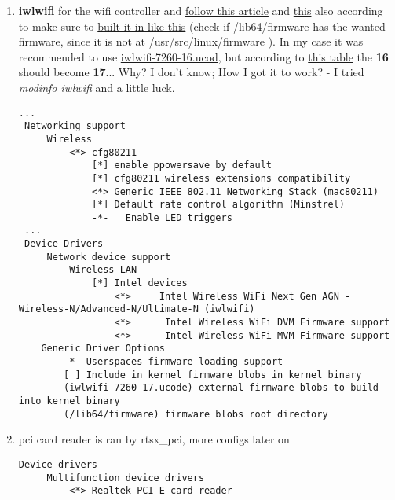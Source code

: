 \documentclass[10pt,a4paper]{article}
\begin{document}
\begin{enumerate}
                    \newpage
                    \item \textbf{iwlwifi} for the wifi controller and  \href{https://wiki.gentoo.org/wiki/Iwlwifi#Kernel}{follow this article} and \href{https://wiki.gentoo.org/wiki/Wifi#Kernel}{this} also according to make sure to \href{https://wiki.gentoo.org/wiki/Iwlwifi#When_using_built-in_configuration}{built it in like this} (check if /lib64/firmware has the wanted firmware, since it is not at /usr/src/linux/firmware ). In my case it was recommended to use \href{https://wiki.gentoo.org/wiki/Lenovo_ThinkPad_T440s#Required_packages}{iwlwifi-7260-16.ucod}, but according to \href{https://wireless.wiki.kernel.org/en/users/drivers/iwlwifi#firmware}{this table} the \textbf{16} should become \textbf{17}... Why? I don't know; How I got it to work? - I tried 
                    \textit{modinfo iwlwifi} and a little luck.
                    \begin{lstlisting}[style=KernelConfig]
 ...
 Networking support
     Wireless
         <*> cfg80211
             [*] enable ppowersave by default
             [*] cfg80211 wireless extensions compatibility
             <*> Generic IEEE 802.11 Networking Stack (mac80211)
             [*] Default rate control algorithm (Minstrel)
             -*-   Enable LED triggers
 ...
 Device Drivers
     Network device support
         Wireless LAN
             [*] Intel devices
                 <*>     Intel Wireless WiFi Next Gen AGN - Wireless-N/Advanced-N/Ultimate-N (iwlwifi)  
                 <*>      Intel Wireless WiFi DVM Firmware support
                 <*>      Intel Wireless WiFi MVM Firmware support
    Generic Driver Options
        -*- Userspaces firmware loading support
        [ ] Include in kernel firmware blobs in kernel binary
        (iwlwifi-7260-17.ucode) external firmware blobs to build into kernel binary
        (/lib64/firmware) firmware blobs root directory
                    \end{lstlisting}

                \newpage
                \item pci card reader is ran by rtsx\_pci, more configs later on
                
                \begin{lstlisting}[style=KernelConfig]
 Device drivers
     Multifunction device drivers
         <*> Realtek PCI-E card reader
                \end{lstlisting}
                
                \end{enumerate}
                
\end{document}
